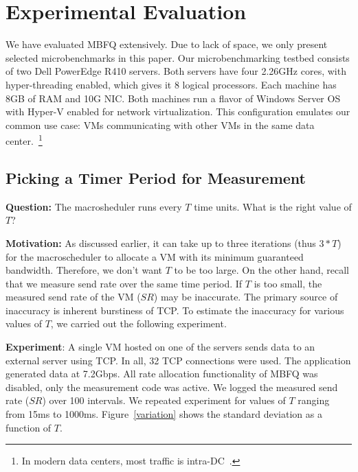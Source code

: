\section{Experimental Evaluation}
\label{sec:experiments}

We have evaluated MBFQ extensively. Due to lack of space, we only present
selected microbenchmarks in this paper. Our microbenchmarking testbed consists
of two Dell PowerEdge R410 servers.  Both servers have four 2.26GHz cores, with
hyper-threading enabled, which gives it 8 logical processors.  Each machine has
8GB of RAM and 10G NIC.  Both machines run a flavor of Windows Server OS with
Hyper-V enabled for network virtualization. This configuration emulates our
common use case: VMs communicating with other VMs in the same data
center.~\footnote{In modern data centers, most traffic is
intra-DC~\cite{fb,kandula09}.} 

\subsection{Picking a Timer Period for Measurement}
{\bf Question:}  The macrosheduler runs every $T$ time units. What is the right
value of $T$?

{\bf Motivation:}  As discussed earlier, it can take up to three iterations (thus
$3*T$) for the macroscheduler to allocate a VM with its minimum
guaranteed bandwidth. Therefore, we don't want $T$ to be too large. On the other hand,
recall that we measure send rate over the same time period. If $T$ is too small,
the measured send rate of the VM ($SR$) may be inaccurate. The primary source of
inaccuracy is inherent burstiness of TCP. To estimate the inaccuracy for
various values of $T$, we carried out the following experiment.

{\bf Experiment}: A single VM hosted on one of the servers sends data to
an external server using TCP. In all, 32 TCP connections were used. The application 
generated data at 7.2Gbps. All rate
allocation functionality of MBFQ was disabled, only the measurement code was
active.  We logged the measured send rate ($SR$) over 100 intervals.  We
repeated experiment for values of $T$ ranging from 15ms to 1000ms.
Figure~\ref{variation} shows the standard deviation as a function of $T$.  

